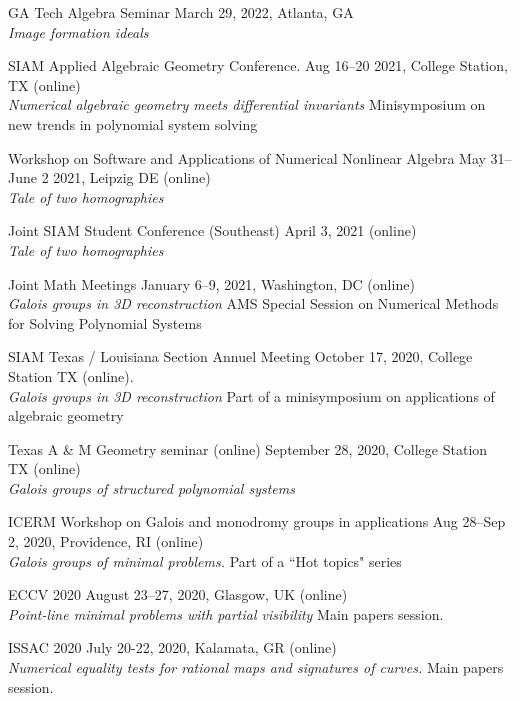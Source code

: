 \documentclass[margin,line,pifont,palatino,courier]{res}
\begin{document}
\begin{resume}
\par GA Tech Algebra Seminar \hfill March 29, 2022, Atlanta, GA\\
\textit{Image formation ideals}

\par SIAM Applied Algebraic Geometry Conference. \hfill Aug 16--20 2021, College Station, TX (online)\\
\textit{Numerical algebraic geometry meets differential invariants} Minisymposium on new trends in polynomial system solving

\par Workshop on Software and Applications of Numerical Nonlinear Algebra  \hfill May 31--June 2 2021, Leipzig DE (online)\\
\textit{Tale of two homographies}

\par Joint SIAM Student Conference (Southeast) \hfill April 3, 2021 (online)\\
\textit{Tale of two homographies}

\par Joint Math Meetings \hfill January 6--9, 2021, Washington, DC (online)\\
\textit{Galois groups in 3D reconstruction} AMS Special Session on Numerical Methods for Solving Polynomial Systems

\par SIAM Texas / Louisiana Section Annuel Meeting \hfill October 17, 2020, College Station TX (online).\\
\textit{Galois groups in 3D reconstruction} Part of a minisymposium on applications of algebraic geometry

\par Texas A \& M Geometry seminar (online) \hfill September 28, 2020, College Station TX (online)\\
\textit{Galois groups of structured polynomial systems}

\par ICERM Workshop on Galois and monodromy groups in applications \hfill Aug 28--Sep 2, 2020, Providence, RI (online)\\
\textit{Galois groups of minimal problems.} Part of a ``Hot topics" series

\par ECCV 2020 \hfill August 23--27, 2020, Glasgow, UK (online)\\
\textit{Point-line minimal problems with partial visibility} Main papers session.

\par ISSAC 2020 \hfill July 20-22, 2020, Kalamata, GR (online)\\
\textit{Numerical equality tests for rational maps and signatures of curves.} Main papers session.


\end{resume}
\end{document}
